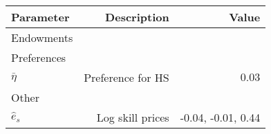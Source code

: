 \begin{tabular}{lrr}
\hline
Parameter & Description  & Value  \\
\hline
Endowments &   &   \\
Preferences &   &   \\
$\bar{\eta}$ & Preference for HS  & $0.03$  \\
Other &   &   \\
$\hat{e}_{s}$ & Log skill prices  & -0.04, -0.01, 0.44  \\
\hline
\end{tabular}%
